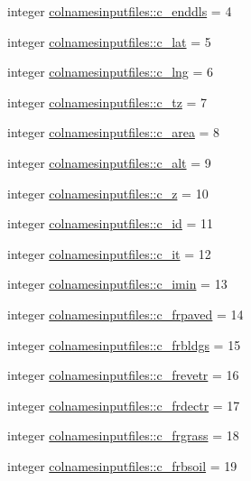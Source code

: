 \begin{DoxyCompactItemize}
\item 
integer \hyperlink{namespacecolnamesinputfiles_af8181e64694030ff21479a0517c9e34c}{colnamesinputfiles\+::c\+\_\+enddls} = 4
\item 
integer \hyperlink{namespacecolnamesinputfiles_ac8c590f73817d76bf8bc5a3112849469}{colnamesinputfiles\+::c\+\_\+lat} = 5
\item 
integer \hyperlink{namespacecolnamesinputfiles_a0bb41b0e2c57e9d0de720760f8032531}{colnamesinputfiles\+::c\+\_\+lng} = 6
\item 
integer \hyperlink{namespacecolnamesinputfiles_a180027882e04f8ca091e0e9560408c66}{colnamesinputfiles\+::c\+\_\+tz} = 7
\item 
integer \hyperlink{namespacecolnamesinputfiles_ab046741b2639e30b8e2ca22061ed6711}{colnamesinputfiles\+::c\+\_\+area} = 8
\item 
integer \hyperlink{namespacecolnamesinputfiles_adebe514d38a358892ea83a34e671956b}{colnamesinputfiles\+::c\+\_\+alt} = 9
\item 
integer \hyperlink{namespacecolnamesinputfiles_af04de24c8940348bbdc10a583bbf396d}{colnamesinputfiles\+::c\+\_\+z} = 10
\item 
integer \hyperlink{namespacecolnamesinputfiles_a060322ec717b9accb785ec79a50c5cd9}{colnamesinputfiles\+::c\+\_\+id} = 11
\item 
integer \hyperlink{namespacecolnamesinputfiles_a63b7102a0bfb2990c3d9ef7d9f3e7a76}{colnamesinputfiles\+::c\+\_\+it} = 12
\item 
integer \hyperlink{namespacecolnamesinputfiles_af4f7bc5a0ee3a5b751aac8da4bd0dbd2}{colnamesinputfiles\+::c\+\_\+imin} = 13
\item 
integer \hyperlink{namespacecolnamesinputfiles_a2f12104ba45c0ff7053d2d7f851ed000}{colnamesinputfiles\+::c\+\_\+frpaved} = 14
\item 
integer \hyperlink{namespacecolnamesinputfiles_a7868294c7f97248046b0a6047dd4f753}{colnamesinputfiles\+::c\+\_\+frbldgs} = 15
\item 
integer \hyperlink{namespacecolnamesinputfiles_a565e5f16a20642fda72028b34cb88bb3}{colnamesinputfiles\+::c\+\_\+frevetr} = 16
\item 
integer \hyperlink{namespacecolnamesinputfiles_a1ebacc2fbd10cdf035cf02a06f33c944}{colnamesinputfiles\+::c\+\_\+frdectr} = 17
\item 
integer \hyperlink{namespacecolnamesinputfiles_ac80dd753bc392e8f2439fcca47c72354}{colnamesinputfiles\+::c\+\_\+frgrass} = 18
\item 
integer \hyperlink{namespacecolnamesinputfiles_abc5659ccd0e939172ca714548673744e}{colnamesinputfiles\+::c\+\_\+frbsoil} = 19

\end{DoxyCompactItemize}
